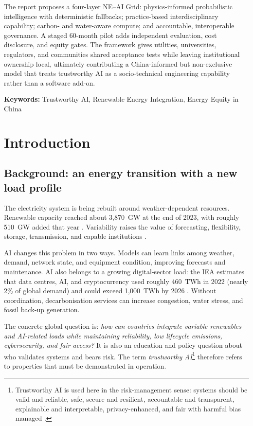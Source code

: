 \documentclass[12pt]{article}
\begin{document}
The report proposes a four-layer NE–AI Grid: physics-informed probabilistic intelligence with deterministic fallbacks; practice-based interdisciplinary capability; carbon- and water-aware compute; and accountable, interoperable governance. A staged 60-month pilot adds independent evaluation, cost disclosure, and equity gates. The framework gives utilities, universities, regulators, and communities shared acceptance tests while leaving institutional ownership local, ultimately contributing a China-informed but non-exclusive model that treats trustworthy AI as a socio-technical engineering capability rather than a software add-on.
			
\noindent\textbf{Keywords:} Trustworthy AI, Renewable Energy Integration, Energy Equity in China


\section{Introduction}

\subsection{Background: an energy transition with a new load profile}

The electricity system is being rebuilt around weather-dependent resources. Renewable capacity reached about 3,870~GW at the end of 2023, with roughly 510~GW added that year \cite{irena2024,iea2024renewables}. Variability raises the value of forecasting, flexibility, storage, transmission, and capable institutions \cite{ipcc2023}.

AI changes this problem in two ways. Models can learn links among weather, demand, network state, and equipment condition, improving forecasts and maintenance. AI also belongs to a growing digital-sector load: the IEA estimates that data centres, AI, and cryptocurrency used roughly 460~TWh in 2022 (nearly 2\% of global demand) and could exceed 1,000~TWh by 2026 \cite{iea2024electricity}. Without coordination, decarbonisation services can increase congestion, water stress, and fossil back-up generation.

The concrete global question is: \emph{how can countries integrate variable renewables and AI-related loads while maintaining reliability, low lifecycle emissions, cybersecurity, and fair access?} It is also an education and policy question about who validates systems and bears risk. The term \emph{trustworthy AI}\footnote{Trustworthy AI is used here in the risk-management sense: systems should be valid and reliable, safe, secure and resilient, accountable and transparent, explainable and interpretable, privacy-enhanced, and fair with harmful bias managed \cite{nist2023}.} therefore refers to properties that must be demonstrated in operation.
\end{document}
